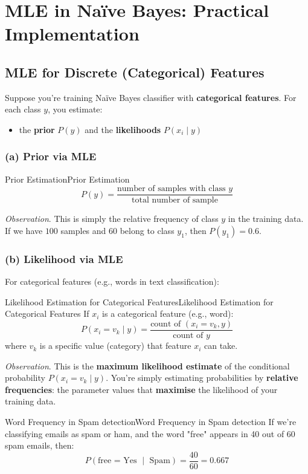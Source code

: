 \documentclass[a4paper]{article}
\theoremstyle{definition}
\begin{document}
\section{MLE in Naïve Bayes: Practical Implementation}
\subsection{MLE for Discrete (Categorical) Features}
Suppose you're training Naïve Bayes classifier with \textbf{categorical features}. For each class \( y \), you estimate:
\begin{itemize}
    \item the \textbf{prior} \( P(y) \) and the \textbf{likelihoods} \( P(x_i\mid y) \)
\end{itemize} 
\subsubsection{(a) Prior via MLE}
\begin{definition}{Prior Estimation}{Prior Estimation}
\[
  P(y) = \frac{\text{number of samples with class } y}{\text{total number of sample}}
\]
\end{definition}
\textit{Observation}. This is simply the relative frequency of class \( y \) in the training data. If we have \( 100 \) samples and 
\( 60 \) belong to class \( y_1 \), then \( P(y_1) = 0.6 \).
\subsubsection{(b) Likelihood via MLE}
For categorical features (e.g., words in text classification):
\begin{definition}{Likelihood Estimation for Categorical Features}{Likelihood Estimation for Categorical Features}
If \( x_i \) is a categorical feature (e.g., word):
\[
  P(x_i = v_k \mid y) = \frac{\text{count of } (x_i = v_k, y)}{\text{count of } y}
\]
where \( v_k \) is a specific value (category) that feature \( x_i \) can take.
\end{definition}
\textit{Observation}. This is the \textbf{maximum likelihood estimate} of the conditional probability \( P(x_i = v_k \mid y) \). You're simply 
estimating probabilities by \textbf{relative frequencies}: the parameter values that \textbf{maximise} the likelihood of your training data.
\begin{example}{Word Frequency in Spam detection}{Word Frequency in Spam detection}
If we're classifying emails as spam or ham, and the word "free" appears in 40 out of 60 spam emails, then:
\[
  P(\text{free = Yes } \mid \text{ Spam}) = \frac{40}{60} = 0.667
\]
\end{example}
\end{document}
